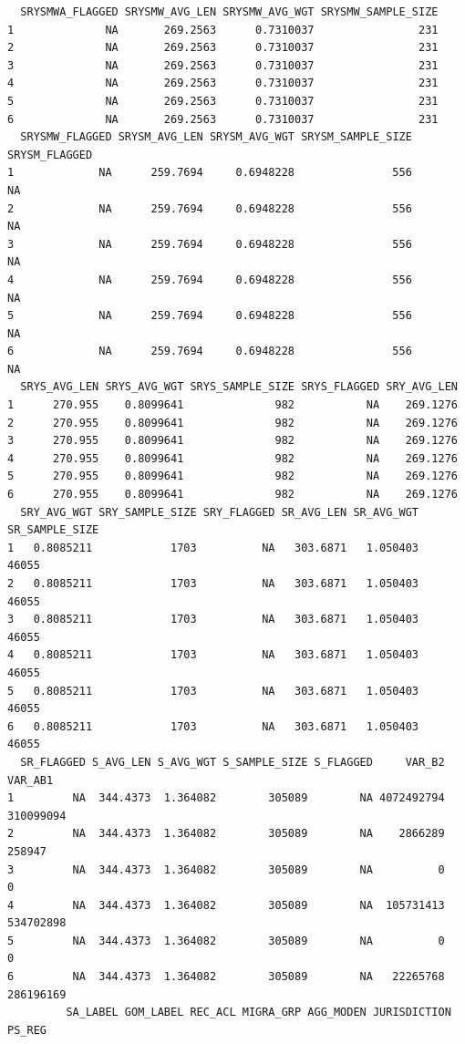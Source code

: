 \documentclass[
  letterpaper,
  oneside,
  open=any]{scrbook}
\begin{document}
\begin{verbatim}
  SRYSMWA_FLAGGED SRYSMW_AVG_LEN SRYSMW_AVG_WGT SRYSMW_SAMPLE_SIZE
1              NA       269.2563      0.7310037                231
2              NA       269.2563      0.7310037                231
3              NA       269.2563      0.7310037                231
4              NA       269.2563      0.7310037                231
5              NA       269.2563      0.7310037                231
6              NA       269.2563      0.7310037                231
  SRYSMW_FLAGGED SRYSM_AVG_LEN SRYSM_AVG_WGT SRYSM_SAMPLE_SIZE SRYSM_FLAGGED
1             NA      259.7694     0.6948228               556            NA
2             NA      259.7694     0.6948228               556            NA
3             NA      259.7694     0.6948228               556            NA
4             NA      259.7694     0.6948228               556            NA
5             NA      259.7694     0.6948228               556            NA
6             NA      259.7694     0.6948228               556            NA
  SRYS_AVG_LEN SRYS_AVG_WGT SRYS_SAMPLE_SIZE SRYS_FLAGGED SRY_AVG_LEN
1      270.955    0.8099641              982           NA    269.1276
2      270.955    0.8099641              982           NA    269.1276
3      270.955    0.8099641              982           NA    269.1276
4      270.955    0.8099641              982           NA    269.1276
5      270.955    0.8099641              982           NA    269.1276
6      270.955    0.8099641              982           NA    269.1276
  SRY_AVG_WGT SRY_SAMPLE_SIZE SRY_FLAGGED SR_AVG_LEN SR_AVG_WGT SR_SAMPLE_SIZE
1   0.8085211            1703          NA   303.6871   1.050403          46055
2   0.8085211            1703          NA   303.6871   1.050403          46055
3   0.8085211            1703          NA   303.6871   1.050403          46055
4   0.8085211            1703          NA   303.6871   1.050403          46055
5   0.8085211            1703          NA   303.6871   1.050403          46055
6   0.8085211            1703          NA   303.6871   1.050403          46055
  SR_FLAGGED S_AVG_LEN S_AVG_WGT S_SAMPLE_SIZE S_FLAGGED     VAR_B2   VAR_AB1
1         NA  344.4373  1.364082        305089        NA 4072492794 310099094
2         NA  344.4373  1.364082        305089        NA    2866289    258947
3         NA  344.4373  1.364082        305089        NA          0         0
4         NA  344.4373  1.364082        305089        NA  105731413 534702898
5         NA  344.4373  1.364082        305089        NA          0         0
6         NA  344.4373  1.364082        305089        NA   22265768 286196169
         SA_LABEL GOM_LABEL REC_ACL MIGRA_GRP AGG_MODEN JURISDICTION PS_REG

\end{verbatim}
\end{document}
